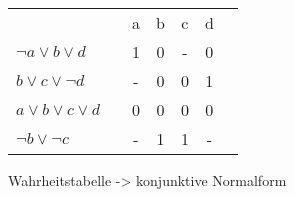 \begin{figure}[!h]
  \centering
  \begin{tabular}{lp{2cm}|cccc|c|}
     &  & a & b & c & d \\
    \cline{3-6}
    $ \neg a \vee b \vee d $   &  & 1 & 0 & - & 0 \\
    $ b \vee c \vee \neg d $   &  & - & 0 & 0 & 1 \\
    $ a \vee b \vee c \vee d $ &  & 0 & 0 & 0 & 0 \\
    $ \neg b \vee \neg c $     &  & - & 1 & 1 & -
  \end{tabular}
  \caption{Wahrheitstabelle -> konjunktive Normalform}
  \label{fig:truetocnf}
\end{figure}










